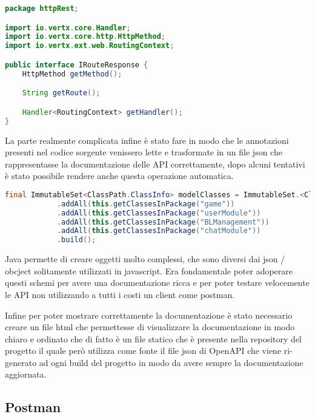 \begin{lstlisting}[language=Java, caption={Semplice interfaccia per le rotte HTTP}, label=list:java_swagger_interface]
package httpRest;

import io.vertx.core.Handler;
import io.vertx.core.http.HttpMethod;
import io.vertx.ext.web.RoutingContext;

public interface IRouteResponse {
	HttpMethod getMethod();

	String getRoute();

	Handler<RoutingContext> getHandler();
}

\end{lstlisting}

La parte realmente complicata infine è stato fare in modo che le annotazioni presenti nel codice sorgente venissero lette e trasformate in un file json che rappresentasse la documentazione delle API correttamente, 
dopo alcuni tentativi è stato possibile rendere anche questa operazione automatica. 

\begin{lstlisting}[language=Java, caption={Aggiunta dei moduli delle classi contenti rotte HTTP}, label=list:java_swagger_modules]
    final ImmutableSet<ClassPath.ClassInfo> modelClasses = ImmutableSet.<ClassPath.ClassInfo>builder()
            .addAll(this.getClassesInPackage("game"))
            .addAll(this.getClassesInPackage("userModule"))
            .addAll(this.getClassesInPackage("BLManagement"))
            .addAll(this.getClassesInPackage("chatModule"))
            .build();
\end{lstlisting}

Java permette di creare oggetti molto complessi, che sono diversi dai json / obcject solitamente utilizzati in javascript. Era fondamentale poter adoperare
questi schemi per avere una documentazione ricca e per poter testare velocemente le API non utilizzando a tutti i costi un client come postman. 

Infine per poter mostrare correttamente la documentazione è stato necessario creare un file html che permettesse di visualizzare la documentazione in modo chiaro e ordinato che 
di fatto è un file statico che è presente nella repository del progetto il quale però utilizza come fonte il file json di OpenAPI che viene ri-generato 
ad ogni build del progetto in modo da avere sempre la documentazione aggiornata.

\subsection{Postman}


